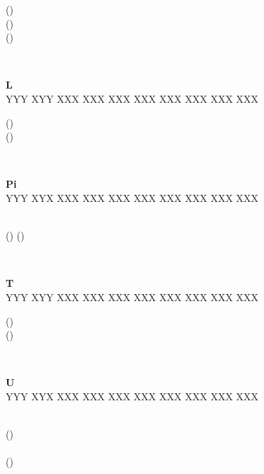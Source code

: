 \parbox{0.7\linewidth}{
	() \\[1em]
	() \\[1em]
  ()
}\\[1em]
%
%
\parbox{0.3\linewidth}{
\begin{center}
  \textbf{L} \\
  \RubikCubeGreyAll%
	      {Y}{Y}{Y}
	      {X}{Y}{Y}%
		 {X}{X}{X}
		 {X}{X}{X}%
		 {X}{X}{X}
		 {X}{X}{X}%
		{X}{X}{X}
		{X}{X}{X}%
		{X}{X}{X}
		{X}{X}{X}%
\end{center}
}%
\parbox{0.7\linewidth}{
	() \\[1em] ()
}\\[1em]
%
%
\parbox{0.3\linewidth}{
\begin{center}
  \textbf{Pi} \\
  \RubikCubeGreyAll%
	      {Y}{Y}{Y}
	      {X}{Y}{X}%
		 {X}{X}{X}
		 {X}{X}{X}%
		 {X}{X}{X}
		 {X}{X}{X}%
		{X}{X}{X}
		{X}{X}{X}%
		{X}{X}{X}
		{X}{X}{X}%
\end{center}
}%
\parbox{0.7\linewidth}{
	 \\[1em]
	() () \\[1em]
}\\[1em]
%
%
\parbox{0.3\linewidth}{
\begin{center}
  \textbf{T} \\
  \RubikCubeGreyAll%
	      {Y}{Y}{Y}
	      {X}{Y}{Y}%
		 {X}{X}{X}
		 {X}{X}{X}%
		 {X}{X}{X}
		 {X}{X}{X}%
		{X}{X}{X}
		{X}{X}{X}%
		{X}{X}{X}
		{X}{X}{X}%
\end{center}
}%
\parbox{0.7\linewidth}{
	() \\[1em] ()
}\\[1em]
%
%
\parbox{0.3\linewidth}{
\begin{center}
  \textbf{U} \\
  \RubikCubeGreyAll%
	      {Y}{Y}{Y}
	      {X}{Y}{X}%
		 {X}{X}{X}
		 {X}{X}{X}%
		 {X}{X}{X}
		 {X}{X}{X}%
		{X}{X}{X}
		{X}{X}{X}%
		{X}{X}{X}
		{X}{X}{X}%
\end{center}
}%
\parbox{0.7\linewidth}{
	 \\[1em] () \\[1em]
	 \\[1em]
	()
}\\[1em]
